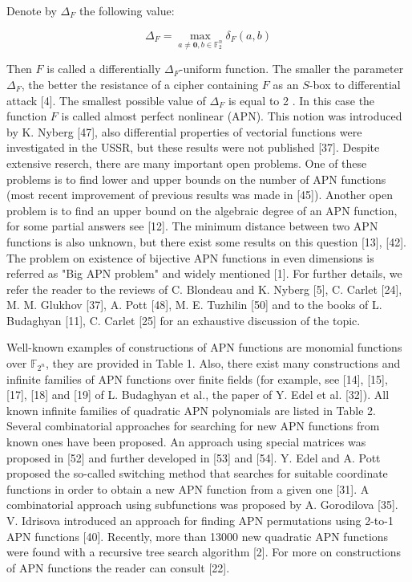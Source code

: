 \documentclass[10pt]{article}
\begin{document}
Denote by $\Delta_{F}$ the following value:

$$
\Delta_{F}=\max _{a \neq \mathbf{0}, b \in \mathbb{F}_{2}^{n}} \delta_{F}(a, b)
$$

Then $F$ is called a differentially $\Delta_{F}$-uniform function. The smaller the parameter $\Delta_{F}$, the better the resistance of a cipher containing $F$ as an $S$-box to differential attack [4]. The smallest possible value of $\Delta_{F}$ is equal to 2 . In this case the function $F$ is called almost perfect nonlinear (APN). This notion was introduced by K. Nyberg [47], also differential properties of vectorial functions were investigated in the USSR, but these results were not published [37]. Despite extensive reserch, there are many important open problems. One of these problems is to find lower and upper bounds on the number of APN functions (most recent improvement of previous results was made in [45]). Another open problem is to find an upper bound on the algebraic degree of an APN function, for some partial answers see [12]. The minimum distance between two APN functions is also unknown, but there exist some results on this question [13], [42]. The problem on existence of bijective APN functions in even dimensions is referred as "Big APN problem" and widely mentioned [1]. For further details, we refer the reader to the reviews of C. Blondeau and K. Nyberg [5], C. Carlet [24], M. M. Glukhov [37], A. Pott [48], M. E. Tuzhilin [50] and to the books of L. Budaghyan [11], C. Carlet [25] for an exhaustive discussion of the topic.

Well-known examples of constructions of APN functions are monomial functions over $\mathbb{F}_{2^{n}}$, they are provided in Table 1. Also, there exist many constructions and infinite families of APN functions over finite fields (for example, see [14], [15], [17], [18] and [19] of L. Budaghyan et al., the paper of Y. Edel et al. [32]). All known infinite families of quadratic APN polynomials are listed in Table 2. Several combinatorial approaches for searching for new APN functions from known ones have been proposed. An approach using special matrices was proposed in [52] and further developed in [53] and [54]. Y. Edel and A. Pott proposed the so-called switching method that searches for suitable coordinate functions in order to obtain a new APN function from a given one [31]. A combinatorial approach using subfunctions was proposed by A. Gorodilova [35]. V. Idrisova introduced an approach for finding APN permutations using 2-to-1 APN functions [40]. Recently, more than 13000 new quadratic APN functions were found with a recursive tree search algorithm [2]. For more on constructions of APN functions the reader can consult [22].
\end{document}
